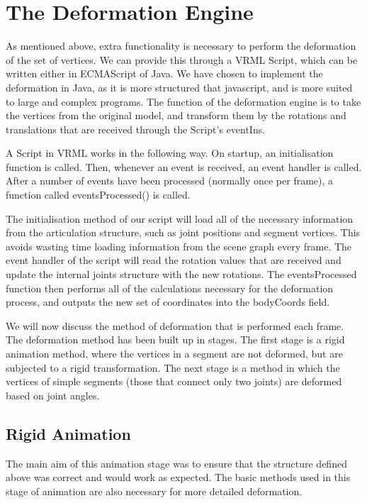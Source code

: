 \documentclass[10pt,oneside,fleqn,a4paper]{book}
\begin{document}
\section{\label{sec:vrmldeformation}The Deformation Engine}
As mentioned above, extra functionality is necessary to perform the deformation of the set of vertices. We can provide this through a VRML Script, which can be written either in ECMAScript of Java. We have chosen to implement the deformation in Java, as it is more structured that javascript, and is more suited to large and complex programs. The function of the deformation engine is to take the vertices from the original model, and transform them by the rotations and translations that are received through the Script's eventIns.

A Script in VRML works in the following way. On startup, an initialisation function is called. Then, whenever an event is received, an event handler is called. After a number of events have been processed (normally once per frame), a function called eventsProcessed() is called.

The initialisation method of our script will load all of the necessary information from the articulation structure, such as joint positions and segment vertices. This avoids wasting time loading information from the scene graph every frame. The event handler of the script will read the rotation values that are received and update the internal joints structure with the new rotations. The eventsProcessed function then performs all of the calculations necessary for the deformation process, and outputs the new set of coordinates into the bodyCoords field.

We will now discuss the method of deformation that is performed each frame. The deformation method has been built up in stages. The first stage is a rigid animation method, where the vertices in a segment are not deformed, but are subjected to a rigid transformation. The next stage is a method in which the vertices of simple segments (those that connect only two joints) are deformed based on joint angles.

\subsection{\label{sec:vrmlrigid}Rigid Animation}
The main aim of this animation stage was to ensure that the structure defined above was correct and would work as expected. The basic methods used in this stage of animation are also necessary for more detailed deformation.
\end{document}
